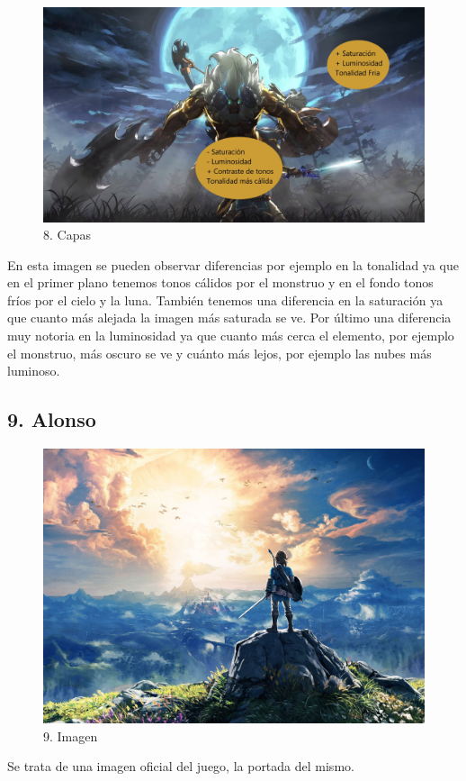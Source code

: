 \documentclass[12pt]{article}
\begin{document}
\begin{figure}[H]
      \centering
      \includegraphics[scale=0.25]{images/Raúl/Sección 8/Imagen 8 capas.jpg}
      \caption{\small 8. Capas}
    \end{figure}

En esta imagen se pueden observar diferencias por ejemplo en la tonalidad ya que en el primer plano tenemos tonos cálidos por el monstruo y en el fondo tonos fríos por el cielo y la luna. También tenemos una diferencia en la saturación ya que cuanto más alejada la imagen más saturada se ve. Por último una diferencia muy notoria en la luminosidad ya que cuanto más cerca el elemento, por ejemplo el monstruo, más oscuro se ve y cuánto más lejos, por ejemplo las nubes más luminoso.

        \newpage


    \subsection{9. Alonso}
    \begin{figure}[H]
      \centering
      \includegraphics[scale=0.1]{images/Concepts/9_concept_art}
      \caption{\small 9. Imagen}
    \end{figure}
    Se trata de una imagen oficial del juego, la portada del mismo.
\end{document}
